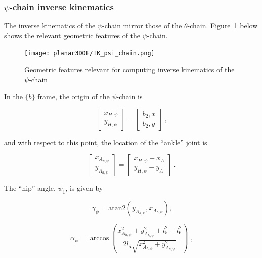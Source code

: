 \documentclass{report}
\begin{document}
\subsubsection[$\psi$-chain inverse kinematics]{$\psi$-chain inverse kinematics}

The inverse kinematics of the $\psi$-chain mirror those of the $\theta$-chain. Figure~\ref{fig:IK_psi_chain} below shows the relevant geometric features of the $\psi$-chain.

\begin{figure}[H]
	\centering
	\texttt{[image: planar3DOF/IK\_psi\_chain.png]}
	\caption{Geometric features relevant for computing inverse kinematics of the $\psi$-chain}
	\label{fig:IK_psi_chain}
\end{figure}

In the $\{b\}$ frame, the origin of the $\psi$-chain is

\begin{equation*}
\begin{bmatrix}
x_{H,\psi}\\
y_{H,\psi}
\end{bmatrix} = \begin{bmatrix}
b_2,x\\
b_2,y
\end{bmatrix}\ \text{,}
\end{equation*}

and with respect to this point, the location of the ``ankle'' joint is

\begin{equation*}
\begin{bmatrix}
x_{A_{h,\psi}}\\
y_{A_{h,\psi}}
\end{bmatrix} = \begin{bmatrix}
x_{H,\psi} - x_A\\
y_{H,\psi} - y_A
\end{bmatrix}\ \text{.}
\end{equation*}

The ``hip'' angle, $\psi_1$, is given by

\begin{equation*}
\gamma_\psi = \text{atan2}(y_{A_{h,\psi}}, x_{A_{h,\psi}}) \text{,}
\end{equation*}

\begin{equation*}
\alpha_\psi = \arccos{\left( \frac{x_{A_{h,\psi}}^2 + y_{A_{h,\psi}}^2 + l_5^2 - l_6^2}{2 l_5 \sqrt{x_{A_{h,\psi}}^2 + y_{A_{h,\psi}} ^2}}\right) } \text{\ ,}
\end{equation*}
\end{document}
